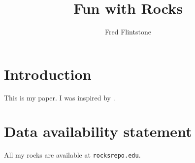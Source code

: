 \documentclass[natbib=false,final]{jfp-epi}
\begin{document}
\title{Fun with Rocks}

\author{Fred Flintstone}

\begin{abstract}
\lipsum[1]
\end{abstract}

\maketitle

\section{Introduction}

This is my paper. I was inspired by \citet{Rubble&Flintstone60}.

\lipsum[2-6]

\section*{Data availability statement}

All my rocks are available at \texttt{rocksrepo.edu}.

\printbibliography
\end{document}
